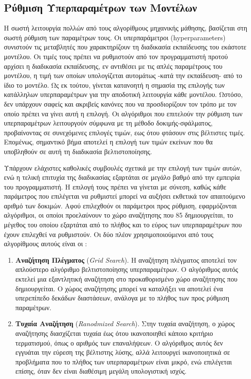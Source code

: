 \documentclass[diploma]{softlab-thesis}
\begin{document}
\begin{enumerate}
\begin{enumerate}
\section{Ρύθμιση Υπερπαραμέτρων των Μοντέλων}

Η σωστή λειτουργία πολλών από τους αλγορίθμους μηχανικής μάθησης, βασίζεται στη σωστή ρύθμιση των παραμέτρων τους. Οι υπερπαράμετροι (hyperparameters) συνιστούν τις μεταβλητές που χαρακτηρίζουν τη διαδικασία εκπαίδευσης του εκάστοτε μοντέλου. Οι τιμές τους πρέπει να ρυθμιστούν από τον προγραμματιστή προτού αρχίσει η διαδικασία εκπαίδευσης, εν αντιθέσει με τις απλές παραμέτρους του μοντέλου, η τιμή των οποίων υπολογίζεται αυτομάτως -κατά την εκπαίδευση- από το ίδιο το μοντέλο. Ως εκ τούτου, γίνεται κατανοητή η σημασία της επιλογής των κατάλληλων υπερπαραμέτρων για την αποδοτική λειτουργία κάθε μοντέλου. Ωστόσο, δεν υπάρχουν σαφείς και ακριβείς κανόνες που να προσδιορίζουν τον τρόπο με τον οποίο πρέπει να γίνει αυτή η επιλογή. Οι αλγόριθμοι που επιτελούν την ρύθμιση των υπερπαραμέτρων λειτουργούν σύμφωνα με τη μέθοδο δοκιμής-σφάλματος, προβαίνοντας σε συνεχόμενες επιλογές τιμών, εως ότου φτάσουν στις βέλτιστες τιμές. Επομένως, σημαντικό βήμα αποτελεί η επιλογή των τιμών εκείνων που θα υποβληθούν σε αυτή τη διαδικασία βελτιστοποίησης.

Υπάρχουν ελάχιστες καθολικές συμβουλές σχετικά με την επιλογή των τιμών αυτών, ενώ η τελική επιτυχία της
διαδικασίας εξαρτάται σε μεγάλο βαθμό από την εμπειρία του προγραμματιστή. Η επιλογή τους πρέπει να γίνεται με σύνεση, καθώς κάθε παράμετρος που επιλέγεται να ρυθμιστεί μπορεί να αυξήσει εκθετικά τον απαιτούμενο αριθμό των δοκιμών. Αφού επιλεχθούν οι παράμετροι προς ρύθμιση, εφαρμόζονται αλγόριθμοι, οι οποίοι προελαύνουν το χώρο αναζήτησης που 85 δημιουργείται, το μέγεθος του οποίου εξαρτάται από το πλήθος και το εύρος των υπερπαραμέτρων που έχουν επιλεχθεί να ρυθμιστούν. Οι δύο πλέον χρησιμοποιούμενοι από τους αλγορίθμους αυτούς είναι οι :
\vspace{0.5cm}



\begin{enumerate}
\item \textbf{Αναζήτηση Πλέγματος} (\textit{Grid Search}). Η αναζήτηση πλέγματος αποτελεί τον απλούστερο αλγόριθμο βελτιστοποίησης υπερπαραμέτρων. Ο αλγόριθμος αυτός εκτελεί μια εξαντλητική αναζήτηση στο προκαθορισμένο χώρο αναζήτησης που δημιουργείται. Ο χώρος αναζήτησης μπορεί να καταλήξει να αποτελεί ένα υπερεπίπεδο δεκάδων διαστάσεων, ανάλογα με το πλήθος των προς ρύθμιση παραμέτρων. 
\item \textbf{Τυχαία Αναζήτηση} (\textit{Ranodmized Search}). Στην τυχαία αναζήτηση, ο χώρος αναζήτησης διασχίζεται τυχαία έως ότου ικανοποιηθεί κάποιο κριτήριο τερματισμού, όπως ο αριθμός των επαναλήψεων. Ο αλγόριθμος αυτός δεν εγγυάται την εύρεση της βέλτιστης λύσης, αλλά λειτουργεί ικανοποιητικά σε προβλήματα που το πλήθος των υπερπαραμέτρων είναι μικρό, ενώ επιλέγεται επίσης, όταν δεν είναι διαθέσιμη μεγάλη υπολογιστική ισχύς.
\end{enumerate}
\vspace{0.5cm}





\end{enumerate}
\end{enumerate}
\end{document}
